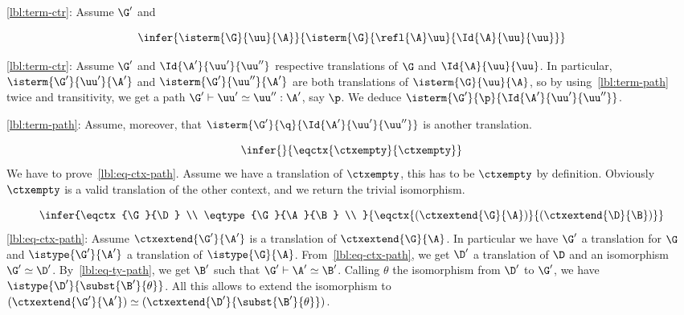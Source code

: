 \eqref{lbl:term-ctr}:
Assume $\G'$ and 



\begin{equation*}
  \infer
  {\isterm{\G}{\uu}{\A}}
  {\isterm{\G}{\refl{\A} \uu}{\Id{\A}{\uu}{\uu}}}
\end{equation*}

\eqref{lbl:term-ctr}:
Assume $\G'$ and $\Id{\A'}{\uu'}{\uu''}$ respective translations of $\G$ and
$\Id{\A}{\uu}{\uu}$.
In particular, $\isterm{\G'}{\uu'}{\A'}$ and $\isterm{\G'}{\uu''}{\A'}$
are both translations of $\isterm{\G}{\uu}{\A}$, so by
using~\eqref{lbl:term-path} twice and transitivity, we get a path
$\G' \vdash \uu' \simeq \uu'' : \A'$, say $\p$.
We deduce $\isterm{\G'}{\p}{\Id{\A'}{\uu'}{\uu''}}$.

\eqref{lbl:term-path}:
Assume, moreover, that $\isterm{\G'}{\q}{\Id{\A'}{\uu'}{\uu''}}$ is another
translation.



\begin{equation*}
  \infer
  { }
  {\eqctx{\ctxempty}{\ctxempty}}
\end{equation*}
%
We have to prove~\eqref{lbl:eq-ctx-path}.
Assume we have a translation of $\ctxempty$, this has to be $\ctxempty$
by definition. Obviously $\ctxempty$ is a valid translation of the other
context, and we return the trivial isomorphism.



\begin{equation*}
  \infer
  {\eqctx{\G}{\D} \\
   \eqtype{\G}{\A}{\B} \\
  }
  {\eqctx{(\ctxextend{\G}{\A})}{(\ctxextend{\D}{\B})}}
\end{equation*}
%
\eqref{lbl:eq-ctx-path}:
Assume $\ctxextend{\G'}{\A'}$ is a translation of $\ctxextend{\G}{\A}$.
In particular we have $\G'$ a translation for $\G$ and $\istype{\G'}{\A'}$
a translation of $\istype{\G}{\A}$.
From~\eqref{lbl:eq-ctx-path}, we get $\D'$ a translation of $\D$ and
an isomorphism $\G' \simeq \D'$.
By~\eqref{lbl:eq-ty-path}, we get $\B'$ such that $\G' \vdash \A' \simeq \B'$.
Calling $\theta$ the isomorphism from $\D'$ to $\G'$, we have
$\istype{\D'}{\subst{\B'}{\theta}}$.
All this allows to extend the isomorphism to
$(\ctxextend{\G'}{\A'}) \simeq (\ctxextend{\D'}{\subst{\B'}{\theta}})$.


